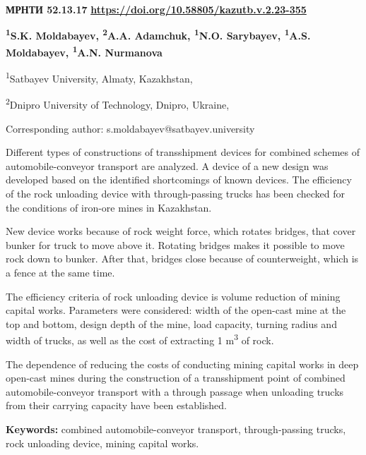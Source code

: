 \newpage
{\bfseries МРНТИ 52.13.17}
\hfill {\bfseries \href{https://doi.org/10.58805/kazutb.v.2.23-355}{https://doi.org/10.58805/kazutb.v.2.23-355}}


\begin{center}
{\bfseries \textsuperscript{1}S.K. Moldabayev\envelope, \textsuperscript{2}A.A. Adamchuk, \textsuperscript{1}N.O. Sarybayev, \textsuperscript{1}A.S. Moldabayev, \textsuperscript{1}A.N. Nurmanova}

\textsuperscript{1}Satbayev University, Almaty, Kazakhstan,

\textsuperscript{2}Dnipro University of Technology, Dnipro, Ukraine,

\envelope Corresponding author: s.moldabayev@satbayev.university
\end{center}

Different types of constructions of transshipment devices for combined
schemes of automobile-conveyor transport are analyzed. A device of a new
design was developed based on the identified shortcomings of known
devices. The efficiency of the rock unloading device with
through-passing trucks has been checked for the conditions of iron-ore
mines in Kazakhstan.

New device works because of rock weight force, which rotates bridges,
that cover bunker for truck to move above it. Rotating bridges makes it
possible to move rock down to bunker. After that, bridges close because
of counterweight, which is a fence at the same time.

The efficiency criteria of rock unloading device is volume reduction of
mining capital works. Parameters were considered: width of the open-cast
mine at the top and bottom, design depth of the mine, load capacity,
turning radius and width of trucks, as well as the cost of extracting 1
m\textsuperscript{3} of rock.

The dependence of reducing the costs of conducting mining capital works
in deep open-cast mines during the construction of a transshipment point
of combined automobile-conveyor transport with a through passage when
unloading trucks from their carrying capacity have been established.

{\bfseries Keywords:} combined automobile-conveyor transport,
through-passing trucks, rock unloading device, mining capital works.

